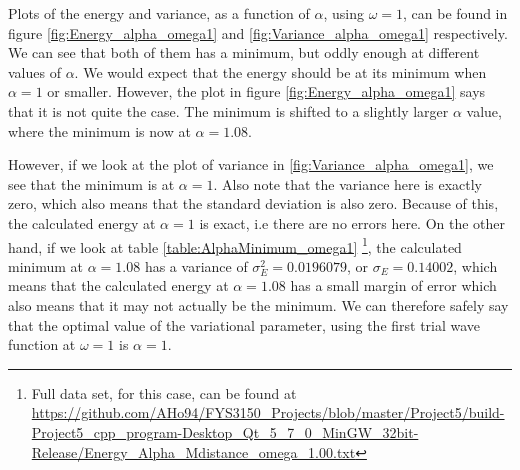 \documentclass[12pt]{article}
\begin{document}
Plots of the energy and variance, as a function of $\alpha$, using $\omega = 1$, can be found in figure \ref{fig:Energy_alpha_omega1} and \ref{fig:Variance_alpha_omega1} respectively. We can see that both of them has a minimum, but oddly enough at different values of $\alpha$. We would expect that the energy should be at its minimum when $\alpha = 1$ or smaller. However, the plot in figure \ref{fig:Energy_alpha_omega1} says that it is not quite the case. The minimum is shifted to a slightly larger $\alpha$ value, where the minimum is now at $\alpha = 1.08$.

However, if we look at the plot of variance in \ref{fig:Variance_alpha_omega1}, we see that the minimum is at $\alpha = 1$. Also note that the variance here is exactly zero, which also means that the standard deviation is also zero. Because of this, the calculated energy at $\alpha = 1$ is exact, i.e there are no errors here. On the other hand, if we look at table \ref{table:AlphaMinimum_omega1} \footnote{Full data set, for this case, can be found at \url{https://github.com/AHo94/FYS3150_Projects/blob/master/Project5/build-Project5_cpp_program-Desktop_Qt_5_7_0_MinGW_32bit-Release/Energy_Alpha_Mdistance_omega_1.00.txt}}, the calculated minimum at $\alpha=1.08$ has a variance of $\sigma_E^2 = 0.0196079$, or $\sigma_E = 0.14002$, which means that the calculated energy at $\alpha = 1.08$ has a small margin of error which also means that it may not actually be the minimum. We can therefore safely say that the optimal value of the variational parameter, using the first trial wave function at $\omega = 1$ is $\alpha = 1$.
\end{document}
